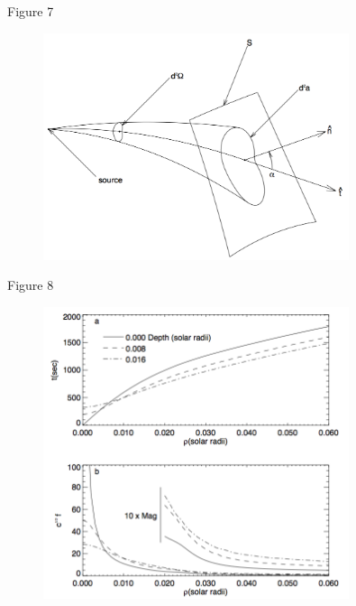 \documentclass{beamer}
\begin{document}
\begin{frame}{Figure 7}
    \begin{figure}
        \includegraphics[width=0.8\textwidth]{fig_7.png}
    \end{figure}
\end{frame}

\begin{frame}{Figure 8}
    \begin{figure}
        \includegraphics[width=0.8\textwidth]{fig_8.png}
    \end{figure}
\end{frame}
\end{document}
